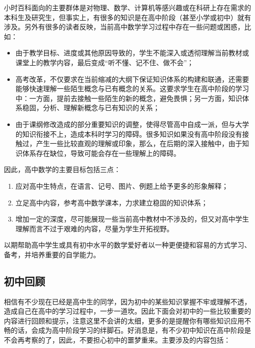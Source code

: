 
\begin{issues}
\issueDraft
\end{issues}

小时百科面向的主要群体是对物理、数学、计算机等感兴趣或在科研上存在需求的本科生及研究生，但事实上，有很多的知识是在高中阶段（甚至小学或初中）就有涉及。另外有很多的读者反映，当前高中数学学习过程中存在一些问题或困惑，比如：
\begin{itemize}
\item 由于教学目标、进度或其他原因导致的，学生不能深入或透彻理解当前教材或课堂上的教学内容，最后变成“听不懂、记不住、做不会”；
\item 高考改革，不仅要求在当前缩减的大纲下保证知识体系的构建和联通，还需要能够快速理解一些陌生概念与已有概念的关系。这要求学生在高中阶段的学习中：一方面，提前去接触一些陌生的新的概念，避免畏惧；另一方面，知识体系稳固，分析、理解新概念与已有知识的关系；
\item 由于课纲修改造成的部分重要知识的调整，使得尽管高中自成一派，但与大学的知识衔接不上，造成本科时学习的障碍。很多知识如果没有高中阶段没有接触过，产生一些比较直观的理解或印象，那么，在后期的深入接触中，由于知识体系存在缺位，导致可能会存在一些理解上的障碍。
\end{itemize}

因此，高中数学的主要目标包括三点：
\begin{enumerate}
\item 应对高中生特点，在语言、记号、图片、例题上给予更多的形象解释；
\item 立足高中内容，参考高中数学课本，力求建立稳固的知识体系；
\item 增加一定的深度，尽可能展现一些当前高中教材中不涉及的，但又对高中学生理解而言不过于艰难的内容，尽量为学生开拓视野。
\end{enumerate}
以期帮助高中学生或具有初中水平的数学爱好者以一种更便捷和容易的方式学习、备考，并培养重要的自学能力。

\subsection{初中回顾}

相信有不少现在已经是高中生的同学，因为初中的某些知识掌握不牢或理解不透，造成自己在高中的学习过程中，一步一道坎。因此下面会对初中的一些比较重要的内容进行回顾和提示，注意这里不会讲的太细，更多的是提醒你有哪些知识应用不畅的话，会成为高中阶段学习的绊脚石。好消息是，有不少初中知识在高中阶段是不会再考察的了，因此，不要担心初中的噩梦重来。主要涉及的内容包括：

